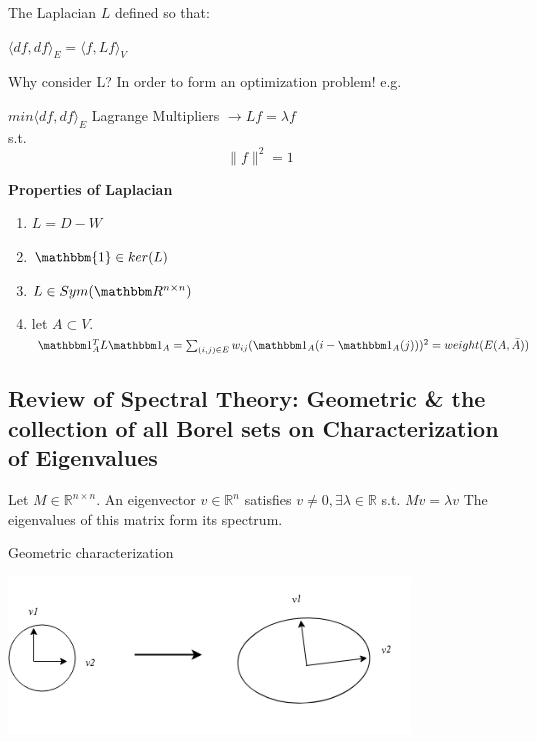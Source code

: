 {	The Laplacian $L$ defined so that:
	\begin{center}
		$\langle df, df\rangle_E = \langle f,Lf\rangle_V$
	\end{center}
	
	Why consider L? In order to form an optimization problem!
	e.g. 
	\begin{center}
		$min \langle df, df\rangle_E $ \indent Lagrange Multipliers $\rightarrow Lf = \lambda f$\\
		s.t. \[ \lVert f \rVert ^2 = 1 \]
	\end{center}
	
	\textbf{Properties of Laplacian}
	\begin{enumerate}
		\item $L = D - W$
		\item $\mathbbm{1} \in ker(L)$
		\item $L \in Sym(\mathbbm R^{n\times n})$
		\item let $A \subset V$. $\mathbbm 1_A^T L \mathbbm 1_A = \sum_{(i,j) \in E} w_{ij} (\mathbbm  1_A(i - \mathbbm 1_A(j)) )^2 = weight(E(A, \bar{A})) $
	\end{enumerate}
	
	\subsection{Review of Spectral Theory: Geometric \& the collection of all Borel sets on Characterization of Eigenvalues}
	
	\begin{definition}
		Let $M \in \mathbb R^{n \times n}$. An eigenvector $v \in \mathbb R^n$ satisfies $v \neq 0, \exists\lambda \in \mathbb R $ s.t. $Mv = \lambda v$
		The eigenvalues of this matrix form its spectrum.
	\end{definition}
	
	\begin{theorem}
		
		Geometric characterization
		
		\includegraphics[width=0.8\textwidth]{chapter_3/files/spec_clust_diag.png}
	\end{theorem}
	
}

